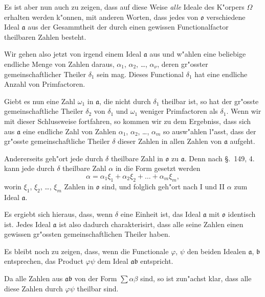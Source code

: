 \documentclass[12pt,a4paper]{article}
\theoremstyle{definition}
\begin{document}
Es ist aber nun auch zu zeigen, dass auf diese Weise \emph{alle} Ideale des K"orpers $\Omega$ erhalten werden k"onnen, mit anderen Worten, dass jedes von $\mathfrak{o}$ verschiedene Ideal $\mathfrak{a}$ aus der Gesammtheit der durch einen gewissen Functionalfactor theilbaren Zahlen besteht.

Wir gehen also jetzt von irgend einem Ideal $\mathfrak{a}$ aus und w"ahlen eine beliebige endliche Menge von Zahlen daraus, $\alpha_1$, $\alpha_2$, \dots, $\alpha_\nu$, deren gr"osster gemeinschaftlicher Theiler $\delta_1$ sein mag. Dieses Functional $\delta_1$ hat eine endliche Anzahl von Primfactoren.

Giebt es nun eine Zahl $\omega_1$ in $\mathfrak{a}$, die nicht durch $\delta_1$ theilbar ist, so hat der gr"osste gemeinschaftliche Theiler $\delta_2$ von $\delta_1$ und $\omega_1$ weniger Primfactoren als $\delta_1$. Wenn wir mit dieser Schlussweise fortfahren, so kommen wir zu dem Ergebniss, dass sich aus $\mathfrak{a}$ eine endliche Zahl von Zahlen $\alpha_1$, $\alpha_2$, \dots, $\alpha_m$ so ausw"ahlen l"asst, dass der gr"osste gemeinschaftliche Theiler $\delta$ dieser Zahlen in allen Zahlen von $\mathfrak{a}$ aufgeht.

Andererseits geh"ort jede durch $\delta$ theilbare Zahl in $\mathfrak{o}$ zu $\mathfrak{a}$. Denn nach \S.~149, 4. kann jede durch $\delta$ theilbare Zahl $\alpha$ in die Form gesetzt werden
\begin{equation}
\alpha = \alpha_1\xi_1 + \alpha_2\xi_2 + \dots + \alpha_m\xi_m,
\end{equation}
worin $\xi_1$, $\xi_2$, \dots, $\xi_m$ Zahlen in $\mathfrak{o}$ sind, und folglich geh"ort nach I und II $\alpha$ zum Ideal $\mathfrak{a}$.

Es ergiebt sich hieraus, dass, wenn $\delta$ eine Einheit ist, das Ideal $\mathfrak{a}$ mit $\mathfrak{o}$ identisch ist. Jedes Ideal $\mathfrak{a}$ ist also dadurch charakterisirt, dass alle seine Zahlen einen gewissen gr"ossten gemeinschaftlichen Theiler haben.

Es bleibt noch zu zeigen, dass, wenn die Functionale $\varphi$, $\psi$ den beiden Idealen $\mathfrak{a}$, $\mathfrak{b}$ entsprechen, das Product $\varphi\psi$ dem Ideal $\mathfrak{a}\mathfrak{b}$ entspricht.

Da alle Zahlen aus $\mathfrak{a}\mathfrak{b}$ von der Form $\sum \alpha\beta$ sind, so ist zun"achst klar, dass alle diese Zahlen durch $\varphi\psi$ theilbar sind.
\end{document}
